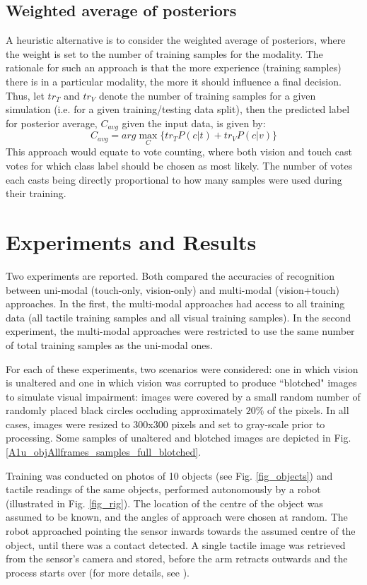 \documentclass[9pt,technote]{IEEEtran}  %
\begin{document}
\subsection{Weighted average of posteriors}
A heuristic alternative is to consider the weighted average of posteriors, where the weight is set to the number of training samples for the modality. The rationale for such an approach is that the more experience (training samples) there is in a particular modality, the more it should influence a final decision. Thus, let $tr_T$ and $tr_V$ denote the number of training samples for a given simulation (i.e. for a given training/testing data split), then the predicted label for posterior average, $C_{avg}$ given the input data, is given by:
\begin{equation}
C_{avg} = arg\max_C \{tr_T P(c|t) + tr_V P(c|v)\}
\label{eqn_cavg}
\end{equation}
This approach would equate to vote counting, where both vision and touch cast votes for which class label should be chosen as most likely. The number of votes each casts being directly proportional to how many samples were used during their training.

\section{Experiments and Results}
Two experiments are reported. Both compared the accuracies of recognition between uni-modal (touch-only, vision-only) and multi-modal (vision+touch) approaches. In the first, the multi-modal approaches had access to all training data (all tactile training samples and all visual training samples). In the second experiment, the multi-modal approaches were restricted to use the same number of total training samples as the uni-modal ones. 

For each of these experiments, two scenarios were considered: one in which vision is unaltered and one in which vision was corrupted to produce ``blotched" images to simulate visual impairment: images were covered by a small random number of randomly placed black circles occluding approximately $20\%$ of the pixels. In all cases, images were resized to 300x300 pixels and set to gray-scale prior to processing. Some samples of unaltered and blotched images are depicted in Fig. \ref{A1u_objAllframes_samples_full_blotched}.

Training was conducted on photos of 10 objects (see Fig. \ref{fig_objects}) and tactile readings of the same objects, performed autonomously by a robot (illustrated in Fig. \ref{fig_rig}). The location of the centre of the object was assumed to be known, and the angles of approach were chosen at random. The robot approached pointing the sensor inwards towards the assumed centre of the object, until there was a contact detected. A single tactile image was retrieved from the sensor's camera and stored, before the arm retracts outwards and the process starts over (for more details, see \cite{Corradi2015}). 
\end{document}
